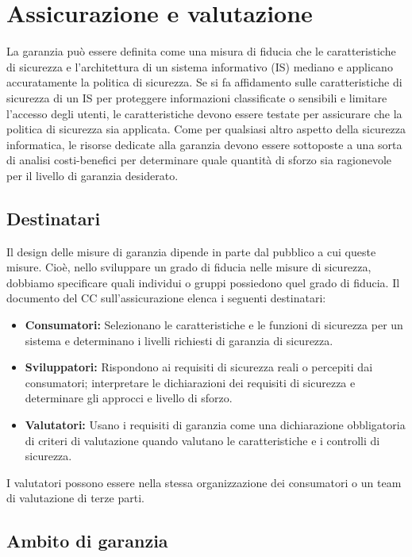 \newpage
\section{Assicurazione e valutazione}
La garanzia può essere definita come una misura di fiducia che le caratteristiche di sicurezza e l'architettura di un sistema informativo (IS) mediano e applicano accuratamente la politica di sicurezza. Se si fa affidamento sulle caratteristiche di sicurezza di un IS per proteggere informazioni classificate o sensibili e limitare l'accesso degli utenti, le caratteristiche devono essere testate per assicurare che la politica di sicurezza sia applicata. Come per qualsiasi altro aspetto della sicurezza informatica, le risorse dedicate alla garanzia devono essere sottoposte a una sorta di analisi costi-benefici per determinare quale quantità di sforzo sia ragionevole per il livello di garanzia desiderato.

\subsection{Destinatari}
Il design delle misure di garanzia dipende in parte dal pubblico a cui queste misure. Cioè, nello sviluppare un grado di fiducia nelle misure di sicurezza, dobbiamo specificare quali individui o gruppi possiedono quel grado di fiducia. Il documento del CC sull'assicurazione elenca i seguenti destinatari:

\begin{itemize}
    \item \textbf{Consumatori:} Selezionano le caratteristiche e le funzioni di sicurezza per un sistema e determinano i livelli richiesti di garanzia di sicurezza.
    
    \item \textbf{Sviluppatori:} Rispondono ai requisiti di sicurezza reali o percepiti dai consumatori; interpretare le dichiarazioni dei requisiti di sicurezza e determinare gli approcci e livello di sforzo.
    
    \item \textbf{Valutatori:} Usano i requisiti di garanzia come una dichiarazione obbligatoria di criteri di valutazione quando valutano le caratteristiche e i controlli di sicurezza.
\end{itemize}

I valutatori possono essere nella stessa organizzazione dei consumatori o un team di valutazione di terze parti.

\newpage
\subsection{Ambito di garanzia}

